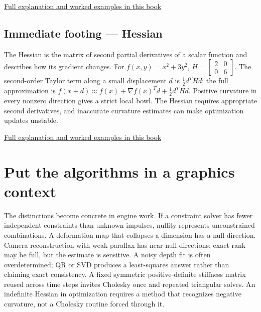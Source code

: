 \hyperref[02-foundations-ii-ch021-jacobians-curvature-and-local-approximation]{Full explanation and worked examples in this book}

\subsection{Immediate footing --- Hessian}\label{01-foundations-i-ch020-immediate-footing-hessian}

\hypertarget{01-foundations-i-ch020-immediate-footing-hessian}{}

The Hessian is the matrix of second partial derivatives of a scalar function and describes how its gradient changes. For \(f(x,y)=x^2+3y^2\), \(H=\begin{bmatrix}2&0\\0&6\end{bmatrix}\). The second-order Taylor term along a small displacement \(d\) is \(\tfrac12d^THd\); the full approximation is \(f(x+d)\approx f(x)+\nabla f(x)^Td+\tfrac12d^THd\). Positive curvature in every nonzero direction gives a strict local bowl. The Hessian requires appropriate second derivatives, and inaccurate curvature estimates can make optimization updates unstable.

\hyperref[02-foundations-ii-ch021-jacobians-curvature-and-local-approximation]{Full explanation and worked examples in this book}

\section{Put the algorithms in a graphics context}\label{01-foundations-i-ch020-put-the-algorithms-in-a-graphics-context}

\hypertarget{01-foundations-i-ch020-put-the-algorithms-in-a-graphics-context}{}

The distinctions become concrete in engine work. If a constraint solver has fewer independent constraints than unknown impulses, nullity represents unconstrained combinations. A deformation map that collapses a dimension has a null direction. Camera reconstruction with weak parallax has near-null directions: exact rank may be full, but the estimate is sensitive. A noisy depth fit is often overdetermined; QR or SVD produces a least-squares answer rather than claiming exact consistency. A fixed symmetric positive-definite stiffness matrix reused across time steps invites Cholesky once and repeated triangular solves. An indefinite Hessian in optimization requires a method that recognizes negative curvature, not a Cholesky routine forced through it.

